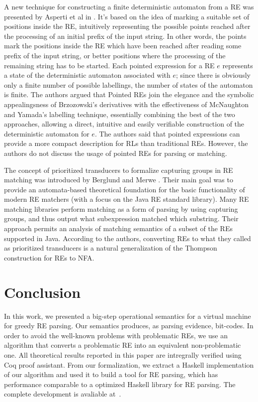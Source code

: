 \documentclass[review]{elsarticle}
\theoremstyle{definition}
\begin{document}
A new technique for constructing a finite deterministic automaton from a 
RE was presented by Asperti et al in \cite{Asperti10}. It's based on the 
idea of marking a suitable set of positions inside the RE, intuitively 
representing the possible points reached after the processing of an initial 
prefix of the input string. In other words, the points mark the positions 
inside the RE which have been reached after reading some prefix of the 
input string, or better positions where the processing of the remaining 
string has to be started. Each pointed expression for a RE $e$ represents 
a state of the deterministic automaton associated with $e$; since there 
is obviously only a finite number of possible labellings, the number 
of states of the automaton is finite. The authors argued that 
Pointed REs join the elegance and the symbolic appealingsness of 
Brzozowski's derivatives with the effectiveness of McNaughton and 
Yamada's labelling technique, essentially combining the best of the 
two approaches, allowing a direct, intuitive and easily verifiable 
construction of the deterministic automaton for $e$. The authors said 
that pointed expressions can provide a more compact description for 
RLs than traditional REs. However, the authors do not discuss the 
usage of pointed REs for parsing or matching.

The concept of prioritized transducers to formalize capturing groups in RE
matching was introduced by Berglund and Merwe \cite{Berglund2016}. Their main
goal was to provide an automata-based theoretical foundation for the basic
functionality of modern RE matchers (with a focus on the Java RE standard
library). Many RE matching libraries perform matching as a form of parsing by 
using capturing groups, and thus output what subexpression matched which
substring. Their approach permits an analysis of matching semantics of a 
subset of the REs supported in Java. According to the authors, converting REs 
to what they called as prioritized transducers is a natural generalization of 
the Thompson construction for REs to NFA.

\section{Conclusion}\label{section:conclusion}

In this work, we presented a big-step operational semantics for a virtual
machine for greedy RE parsing. 
Our semantics produces, as parsing evidence, bit-codes. In order to avoid the well-known problems with 
problematic REs, we use an algorithm that converts a problematic RE into an equivalent non-problematic one.
All theoretical results reported in this paper are intregrally verified using
Coq proof assistant. 
From our formalization, we extract a Haskell implementation of our algorithm and used it to build 
a tool for RE parsing, which has performance comparable to a optimized Haskell library
for RE parsing. The complete development is avaliable at~\cite{regexvm-rep}.
\end{document}
